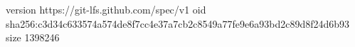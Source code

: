 version https://git-lfs.github.com/spec/v1
oid sha256:c3d34c633574a574de8f7cc4e37a7cb2c8549a77fe9e6a93bd2c89d8f24d6b93
size 1398246
